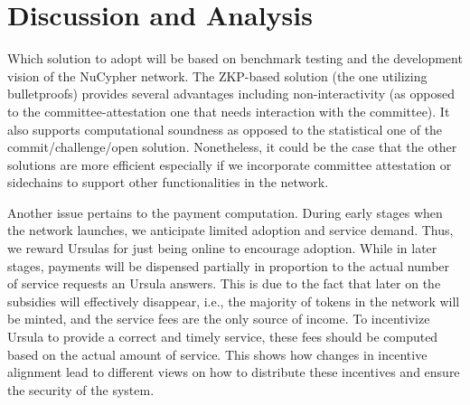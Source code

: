 \section{Discussion and Analysis}
\label{discussion}
Which solution to adopt will be based on benchmark testing and the development vision of the NuCypher network. The ZKP-based solution (the one utilizing bulletproofs) provides several advantages including non-interactivity (as opposed to the committee-attestation one that needs interaction with the committee). It also supports computational soundness as opposed to the statistical one of the commit/challenge/open solution. Nonetheless, it could be the case that the other solutions are more efficient especially if we incorporate committee attestation or sidechains to support other functionalities in the network. 


Another issue pertains to the payment computation. During early stages when the network launches, we anticipate  limited adoption and service demand. Thus, we reward Ursulas for just being online to encourage adoption. While in later stages, payments will be dispensed partially in proportion to the actual number of service requests an Ursula answers. This is due to the fact that later on the subsidies will effectively disappear, i.e., the majority of tokens in the network will be minted, and the service fees are the only source of income. To incentivize Ursula to provide a correct and timely service, these fees should be computed based on the actual amount of service. This shows how changes in incentive alignment lead to different views on how to distribute these incentives and ensure the security of the system.
